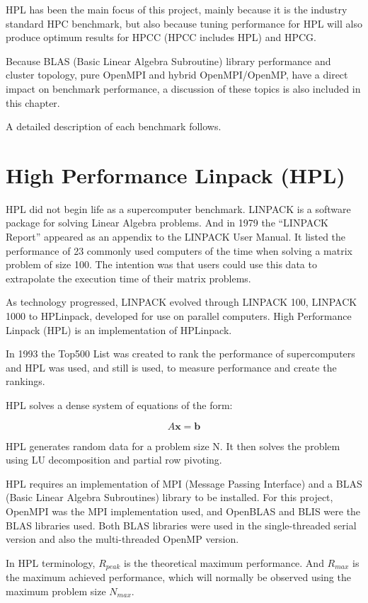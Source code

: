\documentclass{report}
\begin{document}
HPL has been the main focus of this project, mainly because it is the industry standard HPC benchmark, but also because tuning performance for HPL will also produce optimum results for HPCC (HPCC includes HPL) and HPCG.

Because BLAS (Basic Linear Algebra Subroutine) library performance and cluster topology, pure OpenMPI and hybrid OpenMPI/OpenMP, have a direct impact on benchmark performance, a discussion of these topics is also included in this chapter. 


A detailed description of each benchmark follows.

%
%
\section{High Performance Linpack (HPL)}

HPL did not begin life as a supercomputer benchmark. LINPACK is a software package for solving Linear Algebra problems. And in 1979 the ``LINPACK Report'' appeared as an appendix to the LINPACK User Manual. It listed the performance of 23 commonly used computers of the time when solving a matrix problem of size 100. The intention was that users could use this data to extrapolate the execution time of their matrix problems.

As technology progressed, LINPACK evolved through LINPACK 100, LINPACK 1000 to HPLinpack, developed for use on parallel computers. High Performance Linpack (HPL) is an implementation of HPLinpack.

In 1993 the Top500 List was created to rank the performance of supercomputers and HPL was used, and still is used, to measure performance and create the rankings.

HPL solves a dense system of equations of the form:

\[A\mathbf{x}=\mathbf{b}\]

HPL generates random data for a problem size N. It then solves the problem using LU decomposition and partial row pivoting.

HPL requires an implementation of MPI (Message Passing Interface) and a BLAS (Basic Linear Algebra Subroutines) library to be installed. For this project, OpenMPI was the MPI implementation used, and OpenBLAS and BLIS were the BLAS libraries used. Both BLAS libraries were used in the single-threaded serial version and also the multi-threaded OpenMP version.

In HPL terminology, $R_{peak}$ is the theoretical maximum performance. And $R_{max}$ is the maximum achieved performance, which will normally be observed using the maximum problem size $N_{max}$.
\end{document}
